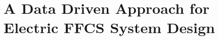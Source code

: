 
\chapter{A Data Driven Approach for Electric FFCS System Design}
\label{chap:6_4cities}
	\graphicspath{{Chapter6/}}









%







